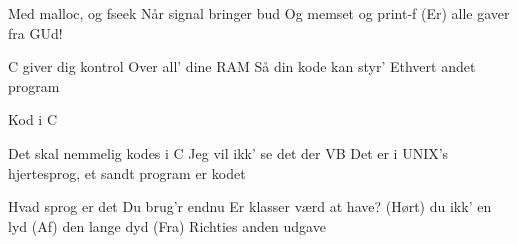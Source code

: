 \documentclass[a4paper,11pt]{article}
\begin{document}
\begin{song}


   Med malloc, og fseek
  Når signal bringer bud
  Og memset og print-f
  (Er) alle gaver fra GUd!

   C giver dig kontrol
  Over all' dine RAM
  Så din kode kan styr'
  Ethvert andet program

   Kod i C





   Det skal nemmelig kodes i C
  Jeg vil ikk' se det der VB
  Det er i UNIX's hjertesprog, et sandt program er kodet


   Hvad sprog er det
  Du brug'r endnu
  Er klasser værd at have?
  (Hørt) du ikk' en lyd
  (Af) den lange dyd
  (Fra) Richties anden udgave

\end{song}
\end{document}
